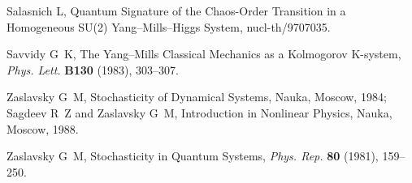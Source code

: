 \documentclass[a4paper,12pt]{article}
\begin{document}
\begin{thebibliography}{99}
 Salasnich L, Quantum Signature of the Chaos-Order Transition in a
Homogeneous SU(2) Yang--Mills--Higgs System, nucl-th/9707035.

 Savvidy G~K, The Yang--Mills Classical Mechanics as a Kolmogorov
K-system, {\it Phys. Lett.}  {\bf B130} (1983), 303--307.

Zaslavsky G~M, Stochasticity of Dynamical Systems, Nauka, Moscow, 1984;\\
Sagdeev R~Z and Zaslavsky G~M, Introduction in Nonlinear Physics, Nauka, Moscow, 1988.

 Zaslavsky G~M, Stochasticity in Quantum Systems, {\it Phys. Rep.} {\bf 80}
(1981), 159--250.
\end{thebibliography}\label{kuvshinov-lastpage}
\end{document}
